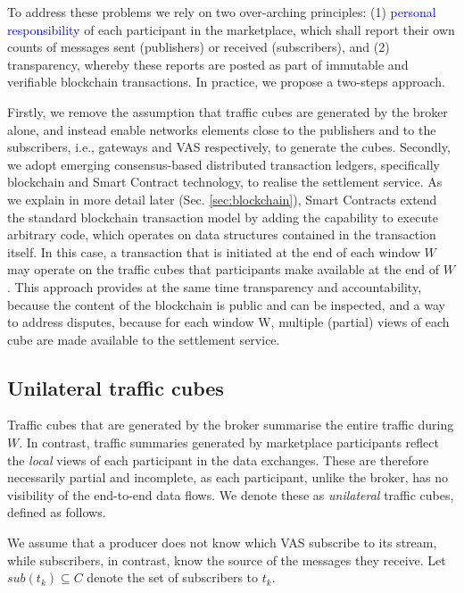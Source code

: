 \documentclass[chi_draft]{sigchi}
\begin{document}
To address these problems we rely on two over-arching principles: (1) \textcolor{blue}{personal responsibility} of each participant in the marketplace, which shall report their own counts of messages sent (publishers) or received (subscribers), and (2) transparency, whereby these reports are posted as part of immutable and verifiable blockchain transactions.
In practice, we propose a two-steps approach.
%

Firstly, we remove the assumption that traffic cubes are generated by the broker alone, and instead enable networks elements close to the publishers and to the subscribers, i.e., gateways and VAS respectively, to generate the cubes.
%
Secondly, we adopt emerging consensus-based distributed transaction ledgers, specifically blockchain and Smart Contract technology, to realise the settlement service.
As we explain in more detail later (Sec. \ref{sec:blockchain}), Smart Contracts extend the standard blockchain transaction model by adding the capability to execute arbitrary code, which operates on data structures contained in the transaction itself. 
In this case, a transaction that is initiated at the end of each window $W$ may operate on the traffic cubes that participants make available at the end of $W$.
This  approach provides at the same time transparency and accountability, because the content of the blockchain is public and can be inspected, and a way to address disputes, because for each window W, multiple (partial) views of each cube are made available to the settlement service.

\subsection{Unilateral traffic cubes} \label{sec:u-cubes}
Traffic cubes that are generated by the broker summarise the entire traffic during $W$.
In contrast, traffic summaries generated by marketplace participants reflect the \textit{local} views of each participant in the data exchanges.
These are therefore necessarily partial and incomplete, as each participant, unlike the broker, has no visibility of the end-to-end data flows. 
We denote these as \textit{unilateral} traffic cubes, defined as follows.

We assume that a producer does not know which VAS subscribe to its stream, while subscribers, in contrast, know the source of the messages they receive. 
Let $\mathit{sub}(t_k) \subseteq C $ denote the set of subscribers to $t_k$.
\end{document}
